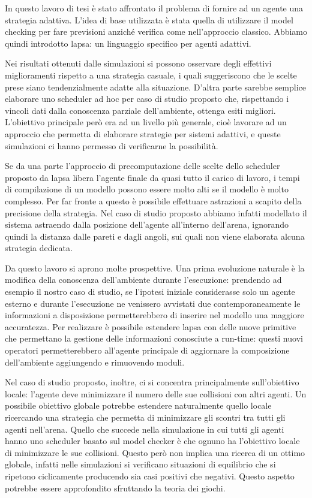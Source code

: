 In questo lavoro di tesi è stato affrontato il problema di fornire ad un agente una strategia adattiva. L'idea di base utilizzata è stata quella di utilizzare il model checking per fare previsioni anziché verifica come nell'approccio classico. Abbiamo quindi introdotto \ac{lapsa}: un linguaggio specifico per agenti adattivi.

Nei risultati ottenuti dalle simulazioni si possono osservare degli effettivi miglioramenti rispetto a una strategia casuale, i quali suggeriscono che le scelte prese siano tendenzialmente adatte alla situazione. D'altra parte sarebbe semplice elaborare uno scheduler ad hoc per caso di studio proposto che, rispettando i vincoli dati dalla conoscenza parziale dell'ambiente, ottenga esiti migliori. L'obiettivo principale però era ad un livello più generale, cioè lavorare ad un approccio che permetta di elaborare strategie per sistemi adattivi, e queste simulazioni ci hanno permesso di verificarne la possibilità. 

Se da una parte l'approccio di precomputazione delle scelte dello scheduler proposto da \ac{lapsa} libera l'agente finale da quasi tutto il carico di lavoro, i tempi di compilazione di un modello possono essere molto alti se il modello è molto complesso. Per far fronte a questo è possibile effettuare astrazioni a scapito della precisione della strategia. Nel caso di studio proposto abbiamo infatti modellato il sistema astraendo dalla posizione dell'agente all'interno dell'arena, ignorando quindi la distanza dalle pareti e dagli angoli, sui quali non viene elaborata alcuna strategia dedicata.

Da questo lavoro si aprono molte prospettive. Una prima evoluzione naturale è la modifica della conoscenza dell'ambiente durante l'esecuzione: prendendo ad esempio il nostro caso di studio, se l'ipotesi iniziale considerasse solo un agente esterno e durante l'esecuzione ne venissero avvistati due contemporaneamente le informazioni a disposizione permetterebbero di inserire nel modello una maggiore accuratezza. Per realizzare è possibile estendere \ac{lapsa} con delle nuove primitive che permettano la gestione delle informazioni conosciute a run-time: questi nuovi operatori permetterebbero all'agente principale di aggiornare la composizione dell'ambiente aggiungendo e rimuovendo moduli.

Nel caso di studio proposto, inoltre, ci si concentra principalmente sull'obiettivo locale: l'agente deve minimizzare il numero delle sue collisioni con altri agenti. Un possibile obiettivo globale potrebbe estendere naturalmente quello locale ricercando una strategia che permetta di minimizzare gli scontri tra tutti gli agenti nell'arena. Quello che succede nella simulazione in cui tutti gli agenti hanno uno scheduler basato sul model checker è che ognuno ha l'obiettivo locale di minimizzare le sue collisioni. Questo però non implica una ricerca di un ottimo globale, infatti nelle simulazioni si verificano situazioni di equilibrio che si ripetono ciclicamente producendo sia casi positivi che negativi. Questo aspetto potrebbe essere approfondito sfruttando la teoria dei giochi.

